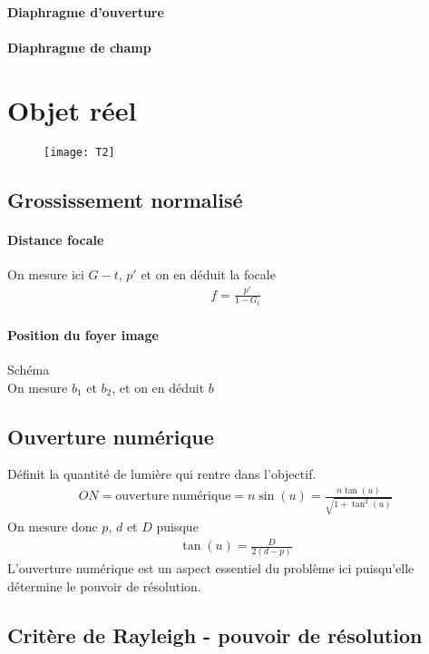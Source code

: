\documentclass[12pt,prb,aps,epsf]{report}
\begin{document}
\paragraph{Diaphragme d'ouverture}
\paragraph{Diaphragme de champ}


\section{Objet réel}
\begin{figure}
	\centerline{\texttt{[image: T2]}}
\end{figure}
\subsection{Grossissement normalisé}
\paragraph{Distance focale}
On mesure ici $G-t$, $p'$ et on en déduit la focale 
\begin{eqnarray}
f = \frac{p'}{1-G_t} 
\end{eqnarray}
\paragraph{Position du foyer image}
Schéma\\
On mesure $b_1$ et $b_2$, et on en déduit $b$

\subsection{Ouverture numérique}
Définit la quantité de lumière qui rentre dans l'objectif.
\begin{eqnarray}
ON = \mathrm{ouverture}\; \mathrm{numérique} = n\sin(u) =  \frac{n\tan(u)}{\sqrt{1+\tan^2(u)}}
\end{eqnarray}
On mesure donc $p$, $d$ et $D$ puisque 
\begin{eqnarray}
\tan(u) = \frac{D}{2(d-p)}
\end{eqnarray}
L'ouverture numérique est un aspect essentiel du problème ici puisqu'elle détermine le pouvoir de résolution.

\subsection{Critère de Rayleigh - pouvoir de résolution}
\end{document}
